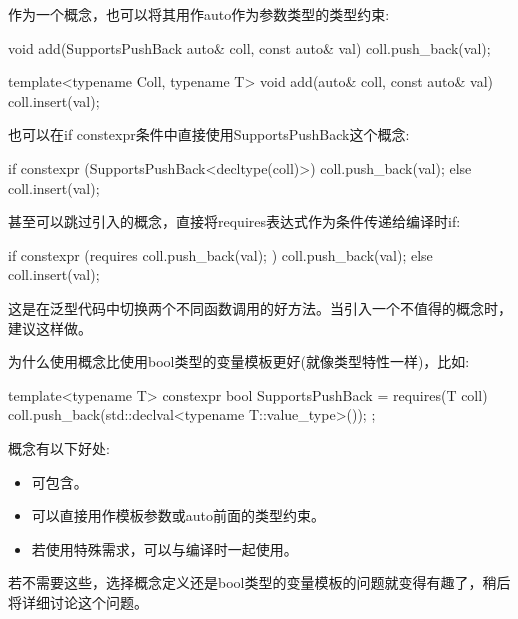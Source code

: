 作为一个概念，也可以将其用作auto作为参数类型的类型约束:

\begin{cpp}
void add(SupportsPushBack auto& coll, const auto& val)
{
	coll.push_back(val);
}

template<typename Coll, typename T>
void add(auto& coll, const auto& val)
{
	coll.insert(val);
}
\end{cpp}


也可以在if constexpr条件中直接使用SupportsPushBack这个概念:

\begin{cpp}
if constexpr (SupportsPushBack<decltype(coll)>) {
	coll.push_back(val);
}
else {
	coll.insert(val);
}
\end{cpp}


甚至可以跳过引入的概念，直接将requires表达式作为条件传递给编译时if:

\begin{cpp}
if constexpr (requires { coll.push_back(val); }) {
	coll.push_back(val);
}
else {
	coll.insert(val);
}
\end{cpp}

这是在泛型代码中切换两个不同函数调用的好方法。当引入一个不值得的概念时，建议这样做。


为什么使用概念比使用bool类型的变量模板更好(就像类型特性一样)，比如:

\begin{cpp}
template<typename T>
constexpr bool SupportsPushBack = requires(T coll) {
	coll.push_back(std::declval<typename T::value_type>());
};
\end{cpp}

概念有以下好处:

\begin{itemize}
\item
可包含。

\item
可以直接用作模板参数或auto前面的类型约束。

\item
若使用特殊需求，可以与编译时一起使用。
\end{itemize}

若不需要这些，选择概念定义还是bool类型的变量模板的问题就变得有趣了，稍后将详细讨论这个问题。


